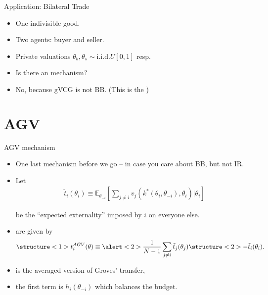 \documentclass[english,10pt
,aspectratio=169
]{beamer}
\begin{document}
\begin{frame}{Application: Bilateral Trade}
	\begin{example}
		\begin{itemize}
			\item One indivisible good.
			\item Two agents: buyer and seller. 
			\item Private valuations $\theta_b,\theta_s \sim \text{i.i.d.} U[0,1]$ resp.
			\item Is there an 
			 mechanism?
		\end{itemize}
	\end{example}
	\begin{itemize}
		\item No, because gVCG is not BB. 
		(This is the )
	\end{itemize}
\end{frame}




\section{AGV}

\begin{frame}{AGV mechanism}
\begin{itemize}
	\item One last mechanism before we go -- in case you care about BB, but not IR.
	\item Let 
	\vspace{-0.5em}\begin{align*}
		\tilde{t}_i (\theta_i) \equiv \mathbb{E}_{\theta_{-i}} \left[ \sum_{j \neq i} v_j (k^*(\theta_i,\theta_{-i}), \theta_i) | \theta_i \right]
	\end{align*}
	
	be the ``expected externality'' imposed by $i$ on everyone else.
	\item {} are given by
	\vspace{-0.5em}\begin{align*}
		\structure<1>{t_i^{AGV} (\theta) \equiv \alert<2>{\frac{1}{N-1} \sum_{j \neq i} \tilde{t}_j (\theta_j)} \structure<2>{- \tilde{t}_i (\theta_i)}}.
	\end{align*}\vspace{-1em}
	\pause
	\item {} is the averaged version of Groves' transfer,
	\item \alert{the first term} is $h_i(\theta_{-i})$ which balances the budget.
\end{itemize}
\end{frame}
\end{document}
